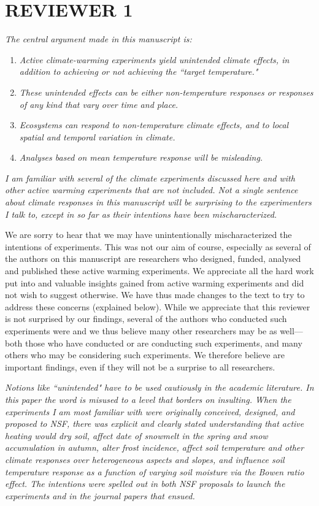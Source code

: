 \documentclass[11pt,a4paper]{letter}
\begin{document}
\begin{letter}{}
\section {REVIEWER 1}

\emph{The central argument made in this manuscript is:}
\begin{enumerate}
\item \emph{Active climate-warming experiments yield unintended climate effects, in addition to achieving or not achieving the ``target temperature."}   
\item \emph{These unintended effects can be either non-temperature responses or responses of any kind that vary over time and place.}
\item \emph{Ecosystems can respond to non-temperature climate effects, and to local spatial and temporal variation in climate.}
\item \emph{Analyses based on mean temperature response will be misleading.}
\end{enumerate}

\emph{I am familiar with several of the climate experiments discussed here and with other active warming experiments that are not included.  Not a single sentence about climate responses in this manuscript will be surprising to the experimenters I talk to, except in so far as their intentions have been mischaracterized.}  

We are sorry to hear that we may have unintentionally mischaracterized the intentions of experiments. This was not our aim of course, especially as several of the authors on this manuscript are researchers who designed, funded, analysed and published these active warming experiments. We appreciate all the hard work put into and valuable insights gained from active warming experiments and did not wish to suggest otherwise. We have thus made changes to the text to try to address these concerns (explained below). While we appreciate that this reviewer is not surprised by our findings, several of the authors who conducted such experiments were and we thus believe many other researchers may be as well---both those who have conducted or are conducting such experiments, and many others who may be considering such experiments. We therefore believe are important findings, even if they will not be a surprise to all researchers.

\emph{Notions like ``unintended" have to be used cautiously in the academic literature.  In this paper the word is misused to a level that borders on insulting.  When the experiments I am most familiar with were originally conceived, designed, and proposed to NSF, there was explicit and clearly stated understanding that active heating would dry soil, affect date of snowmelt in the spring and snow accumulation in autumn, alter frost incidence, affect soil temperature and other climate responses over heterogeneous aspects and slopes, and influence soil temperature response as a function of varying soil moisture via the Bowen ratio effect.  The intentions were spelled out in both NSF proposals to launch the experiments and in the journal papers that ensued.}


\end{letter}
\end{document}
